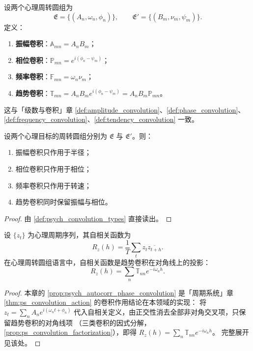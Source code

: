 \begin{definition}\label{def:psych_convolution_types}
设两个心理周转圆组为
\[
\mathfrak E=\{(A_n,\omega_n,\phi_n)\},\qquad
\mathfrak E'=\{(B_m,\nu_m,\psi_m)\}.
\]
定义：
\begin{enumerate}[label=(\roman*)]
    \item \textbf{振幅卷积}：$\mathbb A_{mn}=A_nB_m$；
    \item \textbf{相位卷积}：$\mathbb P_{mn}=e^{i(\phi_n-\psi_m)}$；
    \item \textbf{频率卷积}：$\mathbb F_{mn}=\omega_n\nu_m$；
    \item \textbf{趋势卷积}：$\mathbb T_{mn}=A_nB_m e^{i(\phi_n-\psi_m)}=A_nB_m\mathbb P_{mn}$。
\end{enumerate}
这与「级数与卷积」章 \cref{def:amplitude_convolution}、\cref{def:phase_convolution}、\cref{def:frequency_convolution}、\cref{def:tendency_convolution} 一致。
\end{definition}

\begin{theorem}[三类卷积在心理周转圆组上的作用]\label{thm:psych_convolution_action}
设两个心理目标的周转圆组分别为 $\mathfrak E$ 与 $\mathfrak E'$。则：
\begin{enumerate}[label=(\roman*)]
    \item 振幅卷积只作用于半径；
    \item 相位卷积只作用于相位；
    \item 频率卷积只作用于转速；
    \item 趋势卷积同时保留振幅与相位。
\end{enumerate}
\end{theorem}

\begin{proof}
由 \cref{def:psych_convolution_types} 直接读出。
\end{proof}

\begin{proposition}[自相关与趋势卷积]\label{prop:psych_autocorr_phase_convolution}
设 $\{z_t\}$ 为心理周期序列，其自相关函数为
\[
R_z(h)=\frac1T\sum_t z_t\overline{z_{t+h}}.
\]
在心理周转圆组语言中，自相关函数是趋势卷积在对角线上的投影：
\[
R_z(h)=\sum_n\mathbb T_{nn}e^{-i\omega_n h}.
\]
\end{proposition}

\begin{proof}
本章的 \cref{prop:psych_autocorr_phase_convolution} 是「周期系统」章 \cref{thm:ps_convolution_action} 的卷积作用结论在本领域的实现：
将 $z_t=\sum_n A_n e^{i(\omega_n t+\phi_n)}$ 代入自相关定义，由正交性消去全部非对角交叉项，只保留趋势卷积的对角线项
（三类卷积的因式分解，\cref{prop:ps_convolution_factorization}），即得 $R_z(h)=\sum_n\mathbb T_{nn}e^{-i\omega_n h}$。
完整展开见该处。
\end{proof}

